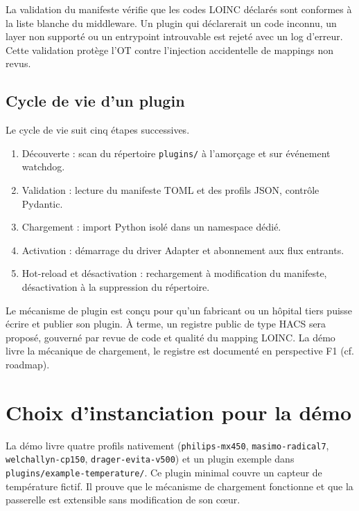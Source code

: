 La validation du manifeste vérifie que les codes LOINC déclarés sont conformes à la liste blanche du middleware. Un plugin qui déclarerait un code inconnu, un layer non supporté ou un entrypoint introuvable est rejeté avec un log d'erreur. Cette validation protège l'OT contre l'injection accidentelle de mappings non revus.

\subsection{Cycle de vie d'un plugin}

Le cycle de vie suit cinq étapes successives.

\begin{enumerate}[leftmargin=2cm]
  \item Découverte : scan du répertoire \texttt{plugins/} à l'amorçage et sur événement watchdog.
  \item Validation : lecture du manifeste TOML et des profils JSON, contrôle Pydantic.
  \item Chargement : import Python isolé dans un namespace dédié.
  \item Activation : démarrage du driver Adapter et abonnement aux flux entrants.
  \item Hot-reload et désactivation : rechargement à modification du manifeste, désactivation à la suppression du répertoire.
\end{enumerate}

\begin{bridgeinfo}
Le mécanisme de plugin est conçu pour qu'un fabricant ou un hôpital tiers puisse écrire et publier son plugin. À terme, un registre public de type HACS sera proposé, gouverné par revue de code et qualité du mapping LOINC. La démo livre la mécanique de chargement, le registre est documenté en perspective F1 (cf. roadmap).
\end{bridgeinfo}

\section{Choix d'instanciation pour la démo}
\label{sec:archi-demo}

La démo livre quatre profils nativement (\texttt{philips-mx450}, \texttt{masimo-radical7}, \texttt{welchallyn-cp150}, \texttt{drager-evita-v500}) et un plugin exemple dans \texttt{plugins/example-temperature/}. Ce plugin minimal couvre un capteur de température fictif. Il prouve que le mécanisme de chargement fonctionne et que la passerelle est extensible sans modification de son c\oe ur.
